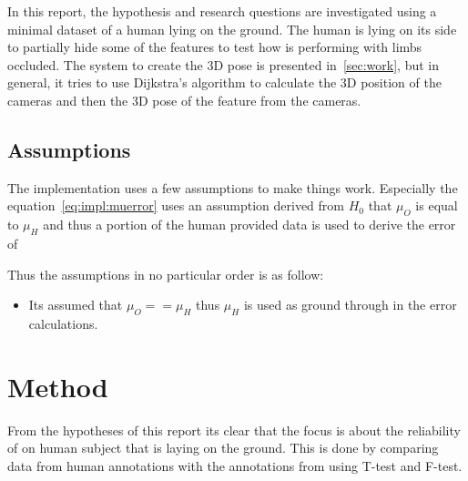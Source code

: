 In this report, the hypothesis and research questions are investigated using a minimal dataset of a human lying on the ground.
The human is lying on its side to partially hide some of the features to test how \openpose{ } is performing with limbs occluded.
The system to create the 3D pose is presented in~\ref{sec:work}, but in general, it tries to use Dijkstra's algorithm to calculate the 3D position of the cameras and then the 3D pose of the feature from the cameras.





\subsection{Assumptions}%
\label{sub:assumptions}
The implementation uses a few assumptions to make things work.
Especially the equation~\ref{eq:impl:muerror} uses an assumption derived from $H_0$ that $\mu_O$ is equal to $\mu_H$ and
thus a portion of the human provided data is used to derive the error of 

\noindent
Thus the assumptions in no particular order is as follow:
\begin{itemize}
    \item Its assumed that $\mu_O == \mu_H$ thus $\mu_H$ is used as ground through in the error calculations.
\end{itemize}


\section{Method}
\label{sec:method}
From the hypotheses of this report its clear that the focus is about the reliability of \openpose{ } on human subject that is laying on the ground.
This is done by comparing  data from human annotations with the annotations from \operpose{} using T-test and F-test.

